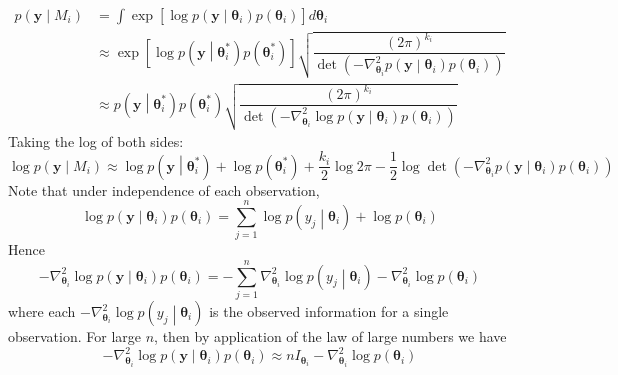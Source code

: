 \documentclass[11pt]{report} %
\begin{document}
\begin{align}
p\left(\mathbf{y}\middle|M_{i}\right) &= \int \exp\left[\log p\left(\mathbf{y}\middle|\boldsymbol{\theta}_{i}\right) p\left(\boldsymbol{\theta}_{i}\right)\right] d\boldsymbol{\theta}_{i} \\
&\approx \exp\left[\log p\left(\mathbf{y}\middle|\boldsymbol{\theta}_{i}^{*}\right) p\left(\boldsymbol{\theta}_{i}^{*}\right)\right]\sqrt{\dfrac{\left(2\pi\right)^{k_{i}}}{\det\left(-\nabla_{\boldsymbol{\theta}_{i}}^{2}p\left(\mathbf{y}\middle|\boldsymbol{\theta}_{i}\right) p\left(\boldsymbol{\theta}_{i}\right)\right)}} \\
&\approx p\left(\mathbf{y}\middle|\boldsymbol{\theta}_{i}^{*}\right) p\left(\boldsymbol{\theta}_{i}^{*}\right)\sqrt{\dfrac{\left(2\pi\right)^{k_{i}}}{\det\left(-\nabla_{\boldsymbol{\theta}_{i}}^{2}\log p\left(\mathbf{y}\middle|\boldsymbol{\theta}_{i}\right) p\left(\boldsymbol{\theta}_{i}\right)\right)}}
\end{align}
Taking the log of both sides:
\begin{equation}
\log p\left(\mathbf{y}\middle|M_{i}\right) \approx \log p\left(\mathbf{y}\middle|\boldsymbol{\theta}_{i}^{*}\right) + \log p\left(\boldsymbol{\theta}_{i}^{*}\right) + \dfrac{k_{i}}{2}\log 2\pi  - \dfrac{1}{2}\log \det\left(-\nabla_{\boldsymbol{\theta}_{i}}^{2}p\left(\mathbf{y}\middle|\boldsymbol{\theta}_{i}\right) p\left(\boldsymbol{\theta}_{i}\right)\right)
\end{equation}
Note that under independence of each observation,
\begin{equation}
\log p\left(\mathbf{y}\middle|\boldsymbol{\theta}_{i}\right) p\left(\boldsymbol{\theta}_{i}\right) = \sum_{j = 1}^{n}\log p\left(y_{j}\middle|\boldsymbol{\theta}_{i}\right) + \log p\left(\boldsymbol{\theta}_{i}\right)
\end{equation}
Hence
\begin{equation}
-\nabla_{\boldsymbol{\theta}_{i}}^{2}\log p\left(\mathbf{y}\middle|\boldsymbol{\theta}_{i}\right) p\left(\boldsymbol{\theta}_{i}\right) = -\sum_{j = 1}^{n}\nabla_{\boldsymbol{\theta}_{i}}^{2}\log p\left(y_{j}\middle|\boldsymbol{\theta}_{i}\right)  -\nabla_{\boldsymbol{\theta}_{i}}^{2}\log p\left(\boldsymbol{\theta}_{i}\right)
\end{equation}
where each $-\nabla_{\boldsymbol{\theta}_{i}}^{2}\log p\left(y_{j}\middle|\boldsymbol{\theta}_{i}\right)$ is the observed information for a single observation. For large $n$, then by application of the law of large numbers we have
\begin{equation}
-\nabla_{\boldsymbol{\theta}_{i}}^{2}\log p\left(\mathbf{y}\middle|\boldsymbol{\theta}_{i}\right) p\left(\boldsymbol{\theta}_{i}\right) \approx n I_{\boldsymbol{\theta}_{i}} -\nabla_{\boldsymbol{\theta}_{i}}^{2}\log p\left(\boldsymbol{\theta}_{i}\right)
\end{equation}
\end{document}
